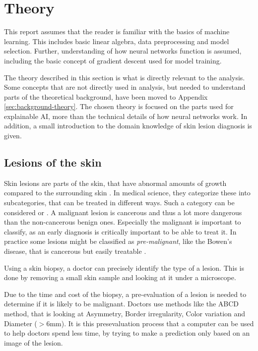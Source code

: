 \chapter{Theory}
This report assumes that the reader is familiar with the basics of machine learning.
This includes basic linear algebra, data preprocessing and model selection.
Further, understanding of how neural networks function is assumed,
including the basic concept of gradient descent used for model training.

The theory described in this section is what is directly relevant to the analysis.
Some concepts that are not directly used in analysis,
but needed to understand parts of the theoretical background,
have been moved to Appendix \ref{sec:background-theory}.
The chosen theory is focused on the parts used for explainable AI, more than the technical details of how neural networks work.
In addition, a small introduction to the domain knowledge of skin lesion diagnosis is given.

\section{Lesions of the skin}
Skin lesions are parts of the skin,
that have abnormal amounts of growth compared to the surrounding skin \cite{dermatologi-laerebogen}.
In medical science, they categorize these into subcategories,
that can be treated in different ways.
Such a category can be considered  or .
A malignant lesion is cancerous and thus a lot more dangerous than the non-cancerous benign ones. 
Especially the malignant  is important to classify,
as an early diagnosis is critically important to be able to treat it\cite{melanoma-cancer-org}.
In practice some lesions might be classified as \textit{pre-malignant},
like the Bowen's disease,
that is cancerous but easily treatable \cite{nhs-bowens-disease}.

Using a skin biopsy,
a doctor can precisely identify the type of a lesion.
This is done by removing a small skin sample and looking at it under a microscope.

Due to the time and cost of the biopsy,
a pre-evaluation of a lesion is needed to determine if it is likely to be malignant.
Doctors use methods like the ABCD method,
that is looking at Asymmetry, Border irregularity, Color variation and Diameter ($>6\text{mm}$)\cite{dermatologi-laerebogen}.
It is this presevaluation process that a computer can be used to help doctors spend less time,
by trying to make a prediction only based on an image of the lesion.

